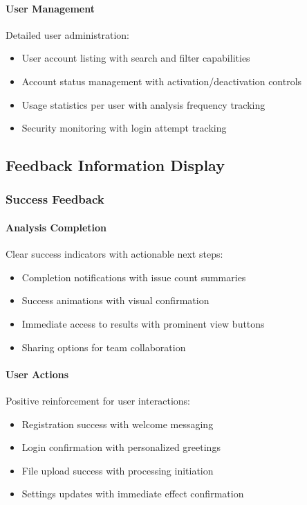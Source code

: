 \documentclass[12pt,a4paper]{article}
\begin{document}
    \paragraph{User Management}
    Detailed user administration:
    \begin{itemize}[leftmargin=0.5in]
        \item User account listing with search and filter capabilities
        \item Account status management with activation/deactivation controls
        \item Usage statistics per user with analysis frequency tracking
        \item Security monitoring with login attempt tracking
    \end{itemize}

    \subsection{Feedback Information Display}

    \subsubsection{Success Feedback}

    \paragraph{Analysis Completion}
    Clear success indicators with actionable next steps:
    \begin{itemize}[leftmargin=0.5in]
        \item Completion notifications with issue count summaries
        \item Success animations with visual confirmation
        \item Immediate access to results with prominent view buttons
        \item Sharing options for team collaboration
    \end{itemize}

    \paragraph{User Actions}
    Positive reinforcement for user interactions:
    \begin{itemize}[leftmargin=0.5in]
        \item Registration success with welcome messaging
        \item Login confirmation with personalized greetings
        \item File upload success with processing initiation
        \item Settings updates with immediate effect confirmation
    \end{itemize}
\end{document}
